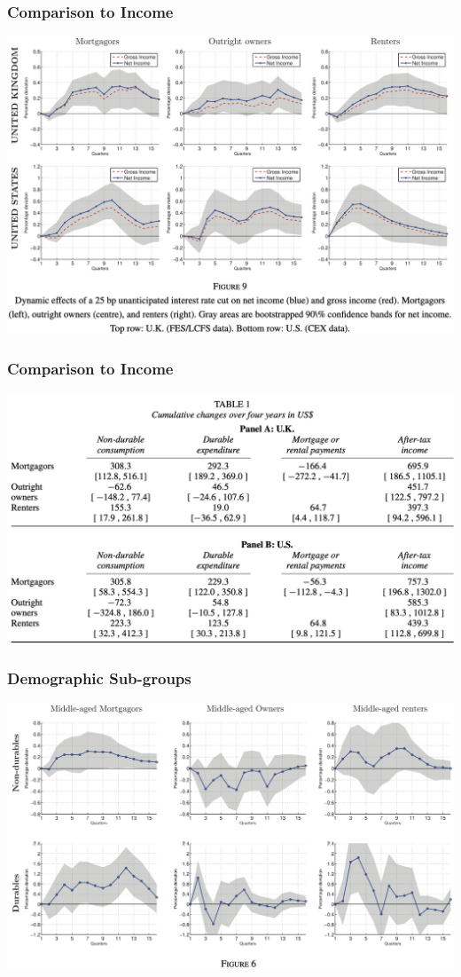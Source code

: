 \documentclass[english,xcolor=svgnames]{beamer}
\begin{document}
\begin{frame}
\frametitle[alignment=center]{Comparison to Income}
\centering
\includegraphics[scale=0.3]{figures/CFSFIG9.png}
\end{frame}

\begin{frame}
\frametitle[alignment=center]{Comparison to Income}
\centering
\includegraphics[scale=0.3]{figures/CFSTAB1.png}
\end{frame}

\begin{frame}
\frametitle[alignment=center]{Demographic Sub-groups}
\centering
\includegraphics[scale=0.3]{figures/CFSFIG6.png}
\end{frame}
\end{document}
